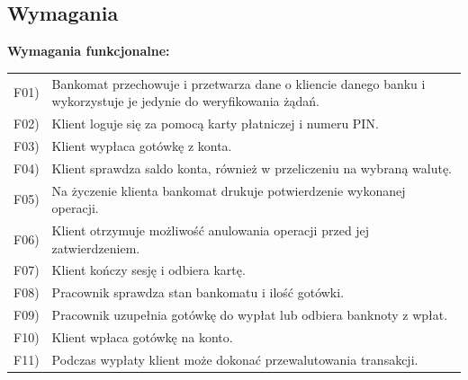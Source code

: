 \documentclass[10pt,a4paper]{article}
\begin{document}
\subsection{Wymagania}

\noindent\textbf{Wymagania funkcjonalne:}\par
\smallskip
\noindent
\begin{tabularx}{\textwidth}{@{}l>{\raggedright\arraybackslash}X@{}}
F01) & Bankomat przechowuje i przetwarza dane o kliencie danego banku i wykorzystuje je jedynie do weryfikowania żądań. \\[4pt]
F02) & Klient loguje się za pomocą karty płatniczej i numeru PIN. \\[4pt]
F03) & Klient wypłaca gotówkę z konta. \\[4pt]
F04) & Klient sprawdza saldo konta, również w przeliczeniu na wybraną walutę. \\[4pt]
F05) & Na życzenie klienta bankomat drukuje potwierdzenie wykonanej operacji. \\[4pt]
F06) & Klient otrzymuje możliwość anulowania operacji przed jej zatwierdzeniem. \\[4pt]
F07) & Klient kończy sesję i odbiera kartę. \\[4pt]
F08) & Pracownik sprawdza stan bankomatu i ilość gotówki. \\[4pt]
F09) & Pracownik uzupełnia gotówkę do wypłat lub odbiera banknoty z wpłat. \\[4pt]
F10) & Klient wpłaca gotówkę na konto. \\[4pt]
F11) & Podczas wypłaty klient może dokonać przewalutowania transakcji.
\end{tabularx}
\end{document}
